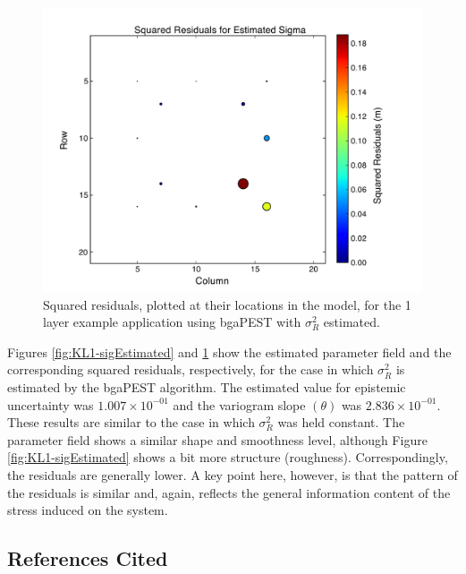 \documentclass[11pt,oneside,onecolumn]{usgsreport}
\begin{document}
\begin{appendix}
\begin{bibunit}
\begin{figure}[!t]
\begin{center} \includegraphics[scale=0.4]{figures/1_layer_estimated_sigma_residuals}\end{center}

\caption{\label{fig:residL1-sigEstimated}Squared residuals, plotted at their
locations in the model, for the 1 layer example application using
bgaPEST with $\sigma_{R}^{2}$ estimated.}
\end{figure}


Figures \ref{fig:KL1-sigEstimated} and \ref{fig:residL1-sigEstimated}
show the estimated parameter field and the corresponding squared residuals,
respectively, for the case in which $\sigma_{R}^{2}$ is estimated
by the bgaPEST algorithm. The estimated value for epistemic uncertainty
was $1.007\times10^{-01}$ and the variogram slope $\left(\theta\right)$
was $2.836\times10^{-01}.$ These results are similar to the case
in which $\sigma_{R}^{2}$ was held constant. The parameter field
shows a similar shape and smoothness level, although Figure \ref{fig:KL1-sigEstimated}
shows a bit more structure (roughness). Correspondingly, the residuals
are generally lower. A key point here, however, is that the pattern
of the residuals is similar and, again, reflects the general information
content of the stress induced on the system.
\subsection{References Cited}
\putbib[GW]
\end{bibunit}


\end{appendix}
\end{document}
